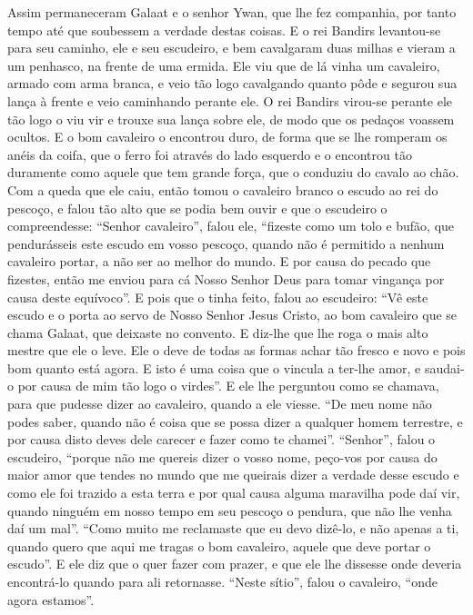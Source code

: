 Assim permaneceram Galaat e o senhor Ywan, que lhe fez companhia, por tanto
tempo até que soubessem a verdade destas coisas. E o rei Bandirs levantou-se
para seu caminho, ele e seu escudeiro, e bem cavalgaram duas milhas e vieram a
um penhasco, na frente de uma ermida. Ele viu que de lá vinha um cavaleiro,
armado com arma branca, e veio tão logo cavalgando quanto pôde e segurou sua
lança à frente e veio caminhando perante ele. O rei Bandirs virou-se perante
ele tão logo o viu vir e trouxe sua lança sobre ele, de modo que os pedaços
voassem ocultos. E o bom cavaleiro o encontrou duro, de forma que se lhe
romperam os anéis da coifa, que o ferro foi através do lado esquerdo e o
encontrou tão duramente como aquele que tem grande força, que o conduziu do
cavalo ao chão. Com a queda que ele caiu, então tomou o cavaleiro branco o
escudo ao rei do pescoço, e falou tão alto que se podia bem ouvir e que o
escudeiro o compreendesse: “Senhor cavaleiro”, falou ele, “fizeste como um tolo
e bufão, que pendurásseis este escudo em vosso pescoço, quando não é permitido
a nenhum cavaleiro portar, a não ser ao melhor do mundo. E por causa do pecado
que fizestes, então me enviou para cá Nosso Senhor Deus para tomar vingança por
causa deste equívoco”. E pois que o tinha feito, falou ao escudeiro:
“Vê este escudo e o porta ao servo de Nosso Senhor Jesus Cristo, ao bom
cavaleiro que se chama Galaat, que deixaste no convento. E diz-lhe que lhe roga
o mais alto mestre que ele o leve. Ele o deve de todas as formas achar tão
fresco e novo e pois bom quanto está agora. E isto é uma coisa que o vincula a
ter-lhe amor, e saudai-o por causa de mim tão logo o virdes”.  E ele
lhe perguntou como se chamava, para que pudesse dizer ao cavaleiro, quando a
ele viesse. “De meu nome não podes saber, quando não é coisa que se possa dizer
a qualquer homem terrestre, e por causa disto deves dele carecer e fazer como
te chamei”. “Senhor”, falou o escudeiro, “porque não me quereis dizer o
vosso nome, peço-vos por causa do maior amor que tendes no mundo que me
queirais dizer a verdade desse escudo e como ele foi trazido a esta terra e por
qual causa alguma maravilha pode daí vir, quando ninguém em nosso tempo em seu
pescoço o pendura, que não lhe venha daí um mal”. “Como muito me reclamaste que
eu devo dizê-lo, e não apenas a ti, quando quero que aqui me tragas o bom
cavaleiro, aquele que deve portar o escudo”. E ele diz que o quer fazer com
prazer, e que ele lhe dissesse onde deveria encontrá-lo quando para ali
retornasse. “Neste sítio”, falou o cavaleiro, “onde agora estamos”.  

